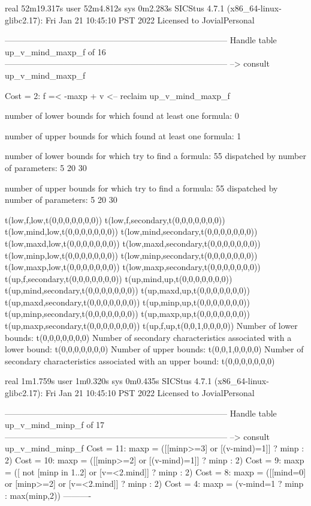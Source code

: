 real	52m19.317s
user	52m4.812s
sys	0m2.283s
SICStus 4.7.1 (x86_64-linux-glibc2.17): Fri Jan 21 10:45:10 PST 2022
Licensed to JovialPersonal


--------------------------------------------------------------------------------
Handle table up_v_mind_maxp_f of 16
--------------------------------------------------------------------------------
--> consult up_v_mind_maxp_f

Cost =  2:  f =< -maxp + v
<-- reclaim up_v_mind_maxp_f

number of lower bounds for which found at least one formula: 0

number of upper bounds for which found at least one formula: 1

number of lower bounds for which try to find a formula: 55
dispatched by number of parameters: 5  20  30

number of upper bounds for which try to find a formula: 55
dispatched by number of parameters: 5  20  30

t(low,f,low,t(0,0,0,0,0,0,0))
t(low,f,secondary,t(0,0,0,0,0,0,0))
t(low,mind,low,t(0,0,0,0,0,0,0))
t(low,mind,secondary,t(0,0,0,0,0,0,0))
t(low,maxd,low,t(0,0,0,0,0,0,0))
t(low,maxd,secondary,t(0,0,0,0,0,0,0))
t(low,minp,low,t(0,0,0,0,0,0,0))
t(low,minp,secondary,t(0,0,0,0,0,0,0))
t(low,maxp,low,t(0,0,0,0,0,0,0))
t(low,maxp,secondary,t(0,0,0,0,0,0,0))
t(up,f,secondary,t(0,0,0,0,0,0,0))
t(up,mind,up,t(0,0,0,0,0,0,0))
t(up,mind,secondary,t(0,0,0,0,0,0,0))
t(up,maxd,up,t(0,0,0,0,0,0,0))
t(up,maxd,secondary,t(0,0,0,0,0,0,0))
t(up,minp,up,t(0,0,0,0,0,0,0))
t(up,minp,secondary,t(0,0,0,0,0,0,0))
t(up,maxp,up,t(0,0,0,0,0,0,0))
t(up,maxp,secondary,t(0,0,0,0,0,0,0))
t(up,f,up,t(0,0,1,0,0,0,0))
Number of lower bounds:                                             t(0,0,0,0,0,0,0)
Number of secondary characteristics associated with a lower bound:  t(0,0,0,0,0,0,0)
Number of upper bounds:                                             t(0,0,1,0,0,0,0)
Number of secondary characteristics associated with an upper bound: t(0,0,0,0,0,0,0)

real	1m1.759s
user	1m0.320s
sys	0m0.435s
SICStus 4.7.1 (x86_64-linux-glibc2.17): Fri Jan 21 10:45:10 PST 2022
Licensed to JovialPersonal


--------------------------------------------------------------------------------
Handle table up_v_mind_minp_f of 17
--------------------------------------------------------------------------------
--> consult up_v_mind_minp_f
Cost = 11:  maxp = ([[minp>=3] or [(v-mind)=1]] ? minp : 2)
Cost = 10:  maxp = ([[minp>=2] or [(v-mind)=1]] ? minp : 2)
Cost =  9:  maxp = ([ not [minp in 1..2] or [v=<2.mind]] ? minp : 2)
Cost =  8:  maxp = ([[mind=0] or [minp>=2] or [v=<2.mind]] ? minp : 2)
Cost =  4:  maxp = (v-mind=1 ? minp : max(minp,2))
----------

